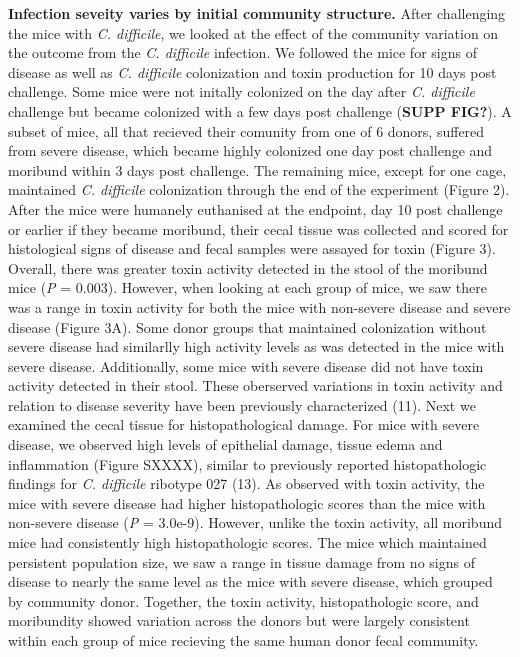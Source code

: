 \documentclass[
  12pt,
]{article}
\begin{document}
\textbf{Infection seveity varies by initial community structure.} After
challenging the mice with \emph{C. difficile}, we looked at the effect
of the community variation on the outcome from the \emph{C. difficile}
infection. We followed the mice for signs of disease as well as \emph{C.
difficile} colonization and toxin production for 10 days post challenge.
Some mice were not initally colonized on the day after \emph{C.
difficile} challenge but became colonized with a few days post challenge
(\textbf{SUPP FIG?}). A subset of mice, all that recieved their comunity
from one of 6 donors, suffered from severe disease, which became highly
colonized one day post challenge and moribund within 3 days post
challenge. The remaining mice, except for one cage, maintained \emph{C.
difficile} colonization through the end of the experiment (Figure 2).
After the mice were humanely euthanised at the endpoint, day 10 post
challenge or earlier if they became moribund, their cecal tissue was
collected and scored for histological signs of disease and fecal samples
were assayed for toxin (Figure 3). Overall, there was greater toxin
activity detected in the stool of the moribund mice (\emph{P} = 0.003).
However, when looking at each group of mice, we saw there was a range in
toxin activity for both the mice with non-severe disease and severe
disease (Figure 3A). Some donor groups that maintained colonization
without severe disease had similarlly high activity levels as was
detected in the mice with severe disease. Additionally, some mice with
severe disease did not have toxin activity detected in their stool.
These oberserved variations in toxin activity and relation to disease
severity have been previously characterized (11). Next we examined the
cecal tissue for histopathological damage. For mice with severe disease,
we observed high levels of epithelial damage, tissue edema and
inflammation (Figure SXXXX), similar to previously reported
histopathologic findings for \emph{C. difficile} ribotype 027 (13). As
observed with toxin activity, the mice with severe disease had higher
histopathologic scores than the mice with non-severe disease (\emph{P} =
3.0e-9). However, unlike the toxin activity, all moribund mice had
consistently high histopathologic scores. The mice which maintained
persistent population size, we saw a range in tissue damage from no
signs of disease to nearly the same level as the mice with severe
disease, which grouped by community donor. Together, the toxin activity,
histopathologic score, and moribundity showed variation across the
donors but were largely consistent within each group of mice recieving
the same human donor fecal community.
\end{document}
